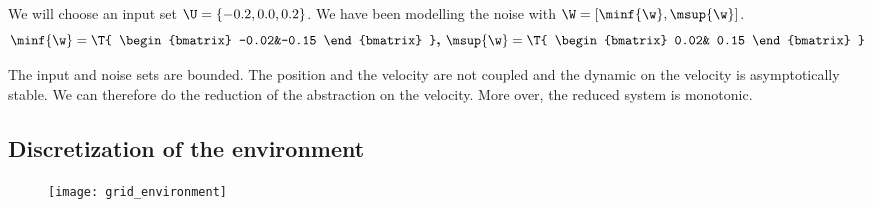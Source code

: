 We will choose an input set $\U = \{-0.2,0.0,0.2\}$.
We have been modelling the noise with $\W = [\minf{\w},\msup{\w}]$.
\begin{equation}
\minf{\w} = \T{ \begin{bmatrix} -0.02&-0.15 \end{bmatrix} }
\textbf{, }
\msup{\w} = \T{ \begin{bmatrix}  0.02& 0.15 \end{bmatrix} }
\end{equation}

The input and noise sets are bounded. The position and the velocity are not coupled and the dynamic on the velocity is asymptotically stable.
We can therefore do the reduction of the abstraction on the velocity. More over, the reduced system is monotonic.

\subsection{Discretization of the environment}
\begin{figure}
\texttt{[image: grid\_environment]}
\end{figure}
